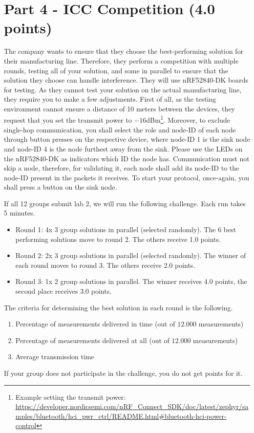 \documentclass[11pt]{article}
\begin{document}
\section*{Part 4 - ICC Competition (4.0 points)}

The company wants to ensure that they choose the best-performing solution for their manufacturing line. Therefore, they perform a competition with multiple rounds, testing all of your solution, and some in parallel to ensure that the solution they choose can handle interference. They will use nRF52840-DK boards for testing. As they cannot test your solution on the actual manufacturing line, they require you to make a few adjustments. First of all, as the testing environment cannot ensure a distance of 10 meters between the devices, they request that you set the transmit power to $-16$dBm\footnote{Example setting the transmit power: \url{https://developer.nordicsemi.com/nRF\_Connect\_SDK/doc/latest/zephyr/samples/bluetooth/hci\_pwr\_ctrl/README.html\#bluetooth-hci-power-control}}. Moreover, to exclude single-hop communication, you shall select the role and node-ID of each node through button presses on the respective device, where node-ID 1 is the sink node and node-ID 4 is the node furthest away from the sink. Please use the LEDs on the nRF52840-DK as indicators which ID the node has. Communication must not skip a node, therefore, for validating it, each node shall add its node-ID to the node-ID present in the packets it receives. To start your protocol, once-again, you shall press a button on the sink node.

If all 12 groups submit lab 2, we will run the following challenge. Each run takes 5 minutes.

\begin{itemize}
    \item Round 1: 4x 3 group solutions in parallel (selected randomly). The 6 best performing solutions move to round 2. The others receive 1.0 points.
    \item Round 2: 2x 3 group solutions in parallel (selected randomly). The winner of each round moves to round 3. The others receive 2.0 points.
    \item Round 3: 1x 2 group solutions in parallel. The winner receives 4.0 points, the second place receives 3.0 points.
\end{itemize}


The criteria for determining the best solution in each round is the following. 

\begin{enumerate}
    \item Percentage of measurements delivered in time (out of $12.000$ measurements)
    \item Percentage of measurements delivered at all (out of $12.000$ measurements)
    \item Average transmission time
\end{enumerate}

If your group does not participate in the challenge, you do not get points for it.
\end{document}
